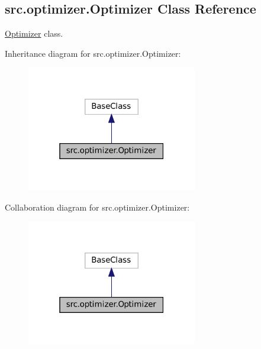 \hypertarget{classsrc_1_1optimizer_1_1Optimizer}{}\subsection{src.\+optimizer.\+Optimizer Class Reference}
\label{classsrc_1_1optimizer_1_1Optimizer}


\hyperlink{classsrc_1_1optimizer_1_1Optimizer}{Optimizer} class.  




Inheritance diagram for src.\+optimizer.\+Optimizer\+:
\nopagebreak
\begin{figure}[H]
\begin{center}
\leavevmode
\includegraphics[width=211pt]{classsrc_1_1optimizer_1_1Optimizer__inherit__graph}
\end{center}
\end{figure}


Collaboration diagram for src.\+optimizer.\+Optimizer\+:
\nopagebreak
\begin{figure}[H]
\begin{center}
\leavevmode
\includegraphics[width=211pt]{classsrc_1_1optimizer_1_1Optimizer__coll__graph}
\end{center}
\end{figure}
